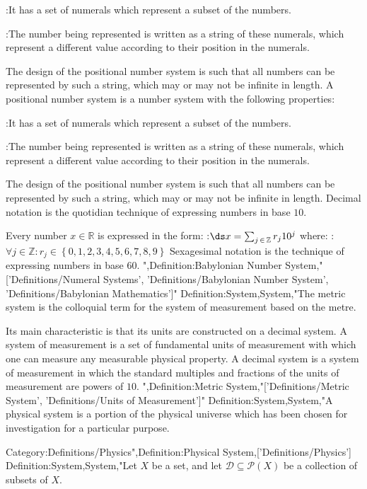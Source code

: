 :It has a set of numerals which represent a subset of the numbers.

:The number being represented is written as a string of these numerals, which represent a different value according to their position in the numerals.

The design of the positional number system is such that all numbers can be represented by such a string, which may or may not be infinite in length.
A positional number system is a number system with the following properties:

:It has a set of numerals which represent a subset of the numbers.

:The number being represented is written as a string of these numerals, which represent a different value according to their position in the numerals.

The design of the positional number system is such that all numbers can be represented by such a string, which may or may not be infinite in length.
Decimal notation is the quotidian technique of expressing numbers in base $10$.

Every number $x \in \mathbb R$ is expressed in the form:
:$\ds x = \sum_{j \mathop \in \mathbb Z} r_j 10^j$
where:
:$\forall j \in \mathbb Z: r_j \in \left\lbrace 0, 1, 2, 3, 4, 5, 6, 7, 8, 9 \right\rbrace$
Sexagesimal notation is the technique of expressing numbers in base $60$.
",Definition:Babylonian Number System,"['Definitions/Numeral Systems', 'Definitions/Babylonian Number System', 'Definitions/Babylonian Mathematics']"
Definition:System,System,"The metric system is the colloquial term for the system of measurement based on the metre.

Its main characteristic is that its units are constructed on a decimal system.
A system of measurement is a set of fundamental units of measurement with which one can measure any measurable physical property.
A decimal system is a system of measurement in which the standard multiples and fractions of the units of measurement are powers of $10$.
",Definition:Metric System,"['Definitions/Metric System', 'Definitions/Units of Measurement']"
Definition:System,System,"A physical system is a portion of the physical universe which has been chosen for investigation for a particular purpose.


Category:Definitions/Physics",Definition:Physical System,['Definitions/Physics']
Definition:System,System,"Let $X$ be a set, and let $\mathcal D \subseteq \mathcal P \left( X \right)$ be a collection of subsets of $X$.


